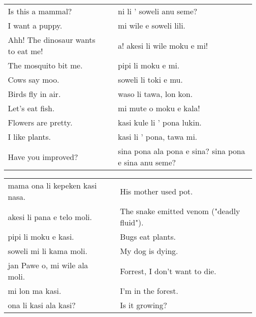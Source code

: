 \begin{supertabular}{p{5,5cm}|ll}
    Is this a mammal?                  &  & ni li ' soweli anu seme?                              \\
    I want a puppy.                    &  & mi wile e soweli lili.                                \\
    Ahh! The dinosaur wants to eat me! &  & a! akesi li wile moku e mi!                           \\
    The mosquito bit me.               &  & pipi li moku e mi.                                    \\
    Cows say moo.                      &  & soweli li toki e mu.                                  \\
    Birds fly in air.                  &  & waso li tawa, lon kon.                                \\
    Let's eat fish.                    &  & mi mute o moku e kala!                                \\
    Flowers are pretty.                &  & kasi kule li ' pona lukin.                            \\
    I like plants.                     &  & kasi li ' pona, tawa mi.                              \\
    Have you improved?                 &  & sina pona ala pona e sina? sina pona e sina anu seme? \\
\end{supertabular}

\begin{supertabular}{p{5,5cm}|ll}
    mama ona li kepeken kasi nasa. &  & His mother used pot.                      \\
    akesi li pana e telo moli.     &  & The snake emitted venom ("deadly fluid"). \\
    pipi li moku e kasi.           &  & Bugs eat plants.                          \\
    soweli mi li kama moli.        &  & My dog is dying.                          \\
    jan Pawe o, mi wile ala moli.  &  & Forrest, I don't want to die.             \\
    mi lon ma kasi.                &  & I'm in the forest.                        \\
    ona li kasi ala kasi?          &  & Is it growing?                            \\
\end{supertabular}

